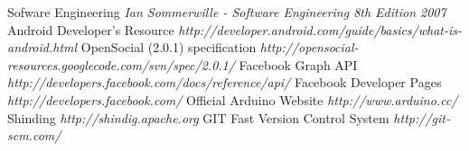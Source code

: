 \begin{thebibliography}{99}
 Sofware Engineering {\em Ian Sommerwille - Software Engineering 8th Edition 2007}
 Android Developer's Resource  {\em http://developer.android.com/guide/basics/what-is-android.html}
 OpenSocial (2.0.1) specification {\em http://opensocial-resources.googlecode.com/svn/spec/2.0.1/}
 Facebook Graph API {\em http://developers.facebook.com/docs/reference/api/}
 Facebook Developer Pages {\em http://developers.facebook.com/}
 Official Arduino Website {\em http://www.arduino.cc/}
 Shinding {\em http://shindig.apache.org}
 GIT Fast Version Control System {\em http://git-scm.com/}
\end{thebibliography}